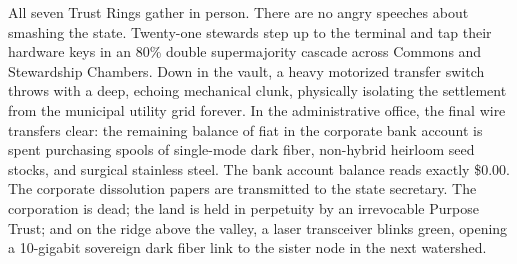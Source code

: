 All seven Trust Rings gather in person. There are no angry speeches about smashing the state. Twenty-one stewards step up to the terminal and tap their hardware keys in an 80\% double supermajority cascade across Commons and Stewardship Chambers. Down in the vault, a heavy motorized transfer switch throws with a deep, echoing mechanical clunk, physically isolating the settlement from the municipal utility grid forever. In the administrative office, the final wire transfers clear: the remaining balance of fiat in the corporate bank account is spent purchasing spools of single-mode dark fiber, non-hybrid heirloom seed stocks, and surgical stainless steel. The bank account balance reads exactly \$0.00. The corporate dissolution papers are transmitted to the state secretary. The corporation is dead; the land is held in perpetuity by an irrevocable Purpose Trust; and on the ridge above the valley, a laser transceiver blinks green, opening a 10-gigabit sovereign dark fiber link to the sister node in the next watershed.

